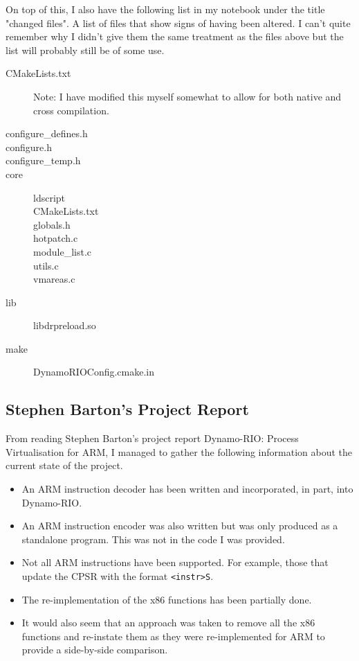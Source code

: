 \documentclass[a4paper]{article}
\begin{document}
On top of this, I also have the following list in my notebook under the title
"changed files". A list of files that show signs of having been altered. I can't
quite remember why I didn't give them the same treatment as the files above but
the list will probably still be of some use.
\begin{description}
\item[CMakeLists.txt] Note: I have modified this myself somewhat to allow for
both native and cross compilation.
\item[configure\_defines.h]
\item[configure.h]
\item[configure\_temp.h]
\item[core]
 \begin{description}
 \item[ldscript]
 \item[CMakeLists.txt]
 \item[globals.h]
 \item[hotpatch.c]
 \item[module\_list.c]
 \item[utils.c]
 \item[vmareas.c]
 \end{description}
\item[lib]
 \begin{description}
 \item[libdrpreload.so]
 \end{description}
\item[make]
 \begin{description}
 \item[DynamoRIOConfig.cmake.in]
 \end{description}
\end{description}

\subsection{Stephen Barton's Project Report}
From reading Stephen Barton's project report Dynamo-RIO: Process Virtualisation
for ARM, I managed to gather the following information about the current state
of the project.
\begin{itemize}
\item An ARM instruction decoder has been written and incorporated, in part,
into Dynamo-RIO.
\item An ARM instruction encoder was also written but was only produced as a
standalone program. This was not in the code I was provided.
\item Not all ARM instructions have been supported. For example, those that
update the CPSR with the format \texttt{<instr>S}.
\item The re-implementation of the x86 functions has been partially done.
\item It would also seem that an approach was taken to remove all the x86
functions and re-instate them as they were re-implemented for ARM to provide a
side-by-side comparison.
\end{itemize}
\end{document}

